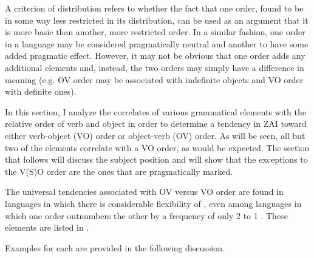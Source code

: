 A criterion of distribution refers to whether the fact that one order, found to be in some way less restricted in its distribution, can be used as an argument that it is more basic than another, more restricted order. In a similar fashion, one order in a language may be considered pragmatically neutral and another to have some added pragmatic effect. However, it may not be obvious that one order adds any additional elements and, instead, the two orders may simply have a difference in meaning (e.g. OV order may be associated with indefinite objects and VO order with definite ones). 


In this section, I analyze the correlates of various grammatical elements with the relative order of verb and object in order to determine a tendency in ZAI toward either verb-object (VO) order or object-verb (OV) order. As will be seen, all but two of the elements correlate with a VO order, as would be expected. The section that follows will discuss the subject position and will show that the exceptions to the V(S)O order are the ones that are pragmatically marked.

The universal tendencies associated with OV versus VO order are found in languages in which there is considerable flexibility of , even among languages in which one order outnumbers the other by a frequency of only 2 to 1 \citep{dryer2007}. These elements are listed in .


Examples for each are provided in the following discussion.

